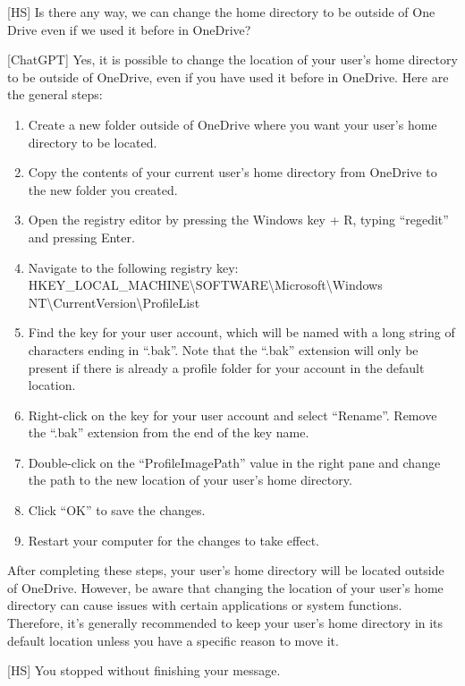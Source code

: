 \documentclass[
]{book}
\providecommand{\tightlist}{%
  \setlength{\itemsep}{0pt}\setlength{\parskip}{0pt}}
\theoremstyle{definition}
\theoremstyle{definition}
\theoremstyle{definition}
\theoremstyle{definition}
\theoremstyle{remark}
\begin{document}
{[}HS{]} Is there any way, we can change the home directory to be outside of One Drive even if we used it before in OneDrive?

{[}ChatGPT{]} Yes, it is possible to change the location of your user's home directory to be outside of OneDrive, even if you have used it before in OneDrive. Here are the general steps:

\begin{enumerate}
\def\labelenumi{\arabic{enumi}.}
\tightlist
\item
  Create a new folder outside of OneDrive where you want your user's home directory to be located.
\item
  Copy the contents of your current user's home directory from OneDrive to the new folder you created.
\item
  Open the registry editor by pressing the Windows key + R, typing ``regedit'' and pressing Enter.
\item
  Navigate to the following registry key: HKEY\_LOCAL\_MACHINE\textbackslash SOFTWARE\textbackslash Microsoft\textbackslash Windows NT\textbackslash CurrentVersion\textbackslash ProfileList
\item
  Find the key for your user account, which will be named with a long string of characters ending in ``.bak''. Note that the ``.bak'' extension will only be present if there is already a profile folder for your account in the default location.
\item
  Right-click on the key for your user account and select ``Rename''. Remove the ``.bak'' extension from the end of the key name.
\item
  Double-click on the ``ProfileImagePath'' value in the right pane and change the path to the new location of your user's home directory.
\item
  Click ``OK'' to save the changes.
\item
  Restart your computer for the changes to take effect.
\end{enumerate}

After completing these steps, your user's home directory will be located outside of OneDrive. However, be aware that changing the location of your user's home directory can cause issues with certain applications or system functions. Therefore, it's generally recommended to keep your user's home directory in its default location unless you have a specific reason to move it.

{[}HS{]} You stopped without finishing your message.
\end{document}
